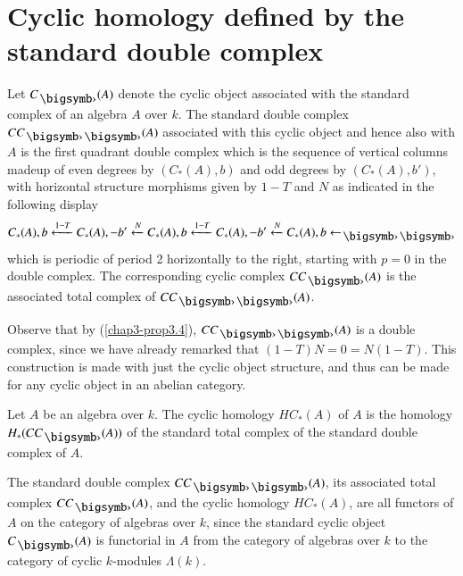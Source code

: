 \section{Cyclic homology defined by the standard double
  complex}\label{chap3-sec4}

\begin{definition}\label{chap3-defi4.1}
Let $C_{\bigdot}(A)$ denote the cyclic object associated with the
standard complex of an algebra $A$ over $k$. The standard double
complex $CC_{\bigdot\bigdot}(A)$ associated with this cyclic object
and hence also with $A$ is the first quadrant double complex which is
the sequence of vertical columns made\pageoriginale up of even degrees
by $(C_{\ast}(A),b)$ and odd degrees by $(C_{\ast}(A),b')$, with
horizontal structure morphisms given by $1-T$ and $N$ as indicated in
the following display
$$
C_{\ast}(A),b\xleftarrow{1-T}C_{\ast}(A),
-b'\xleftarrow{N}C_{\ast}(A), b\xleftarrow{1-T}C_{\ast}(A),-b'\xleftarrow{N}C_{\ast}(A),b\leftarrow_{\bigdot\bigdot}
$$
which is periodic of period 2 horizontally to the right, starting with
$p=0$ in the double complex. The corresponding cyclic complex
$CC_{\bigdot}(A)$ is the associated total complex of
$CC_{\bigdot\bigdot}(A)$. 
\end{definition}

Observe that by (\ref{chap3-prop3.4}), $CC_{\bigdot\bigdot}(A)$ is a
double complex, since we have already remarked that
$(1-T)N=0=N(1-T)$. This construction is made with just the cyclic
object structure, and thus can be made for any cyclic object in an
abelian category.

\begin{definition}\label{chap3-defi4.2}
Let $A$ be an algebra over $k$. The cyclic homology $HC_{\ast}(A)$ of
$A$ is the homology $H_{\ast}(CC_{\bigdot}(A))$ of the standard total
complex of the standard double complex of $A$.
\end{definition}

\begin{remark}\label{chap3-rem4.3}
The standard double complex $CC_{\bigdot\bigdot}(A)$, its associated
total complex $CC_{\bigdot}(A)$, and the cyclic homology
$HC_{\ast}(A)$, are all functors of $A$ on the category of algebras
over $k$, since the standard cyclic object $C_{\bigdot}(A)$ is
functorial in $A$ from the category of algebras over $k$ to the
category of cyclic $k$-modules $\Lambda(k)$.
\end{remark}

